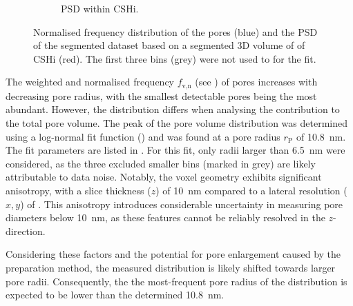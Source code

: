 \begin{figure}[H]
\begin{subfigure}[t]{0.49\textwidth}
		\caption{\ac{PSD} within \ac{CSHi}.}
		\label{fig:fib_highres_hist_3D-b}
	\end{subfigure}
	\caption{
		Normalised frequency distribution of the pores ({\color{blue}blue}) and the \ac{PSD} of the segmented dataset based on a segmented 3D volume of of \ac{CSHi} ({\color{red}red}).
		The first three bins ({\color{darkgrey}grey}) were not used to for the fit.
	}
	\label{fig:fib_highres_hist_3D}
\end{figure}


The weighted and normalised frequency $f_\text{v,n}$ (see ) of pores increases with decreasing pore radius, with the smallest detectable pores being the most abundant.
However, the distribution differs when analysing the contribution to the total pore volume.
The peak of the pore volume distribution was determined using a log-normal fit function () and was found at a pore radius $r_\text{P}$ of \qty{10.8}{\nano\meter}.
The fit parameters are listed in .
For this fit, only radii larger than \qty{6.5}{\nano\meter} were considered, as the three excluded smaller bins (marked in grey) are likely attributable to data noise.
Notably, the voxel geometry exhibits significant anisotropy, with a slice thickness ($z$) of \qty{10}{\nano\meter} compared to a lateral resolution ($x, y$) of .
This anisotropy introduces considerable uncertainty in measuring pore diameters below \qty{10}{\nano\meter}, as these features cannot be reliably resolved in the $z$-direction.

Considering these factors and the potential for pore enlargement caused by the preparation method, the measured distribution is likely shifted towards larger pore radii.
Consequently, the the most-frequent pore radius of the distribution is expected to be lower than the determined \qty{10.8}{\nano\meter}.

